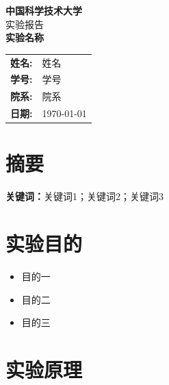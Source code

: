 \documentclass[UTF8,a4paper,12pt]{ctexart}
\newcommand{\reporttitle}{实验名称}
\newcommand{\studentname}{姓名}
\newcommand{\studentid}{学号}
\newcommand{\department}{院系}
\newcommand{\reportdate}{\today}
\begin{document}
\begin{titlepage}
  \centering
  \vspace*{2cm}
  {\LARGE\bfseries 中国科学技术大学}\\[0.5cm]
  {\Large 实验报告}\\[2.5cm]
  {\Huge\bfseries \reporttitle}\\[3cm]
  \begin{tabular}{rl}
    \textbf{姓名:} & \studentname \\[0.3cm]
    \textbf{学号:} & \studentid \\[0.3cm]
    \textbf{院系:} & \department \\[0.3cm]
    \textbf{日期:} & \reportdate \\
  \end{tabular}
  \vfill
\end{titlepage}

\section*{摘要}


\vspace{0.5cm}
\noindent\textbf{关键词：}关键词1；关键词2；关键词3

\section{实验目的}

\begin{itemize}
  \item 目的一
  \item 目的二
  \item 目的三
\end{itemize}

\section{实验原理}


\begin{equation}
  \label{eq:main}
\end{equation}
\end{document}
